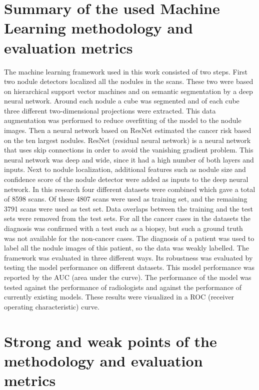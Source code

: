 \documentclass{article}
\begin{document}
\section{Summary of the used Machine Learning methodology and evaluation metrics}
The machine learning framework used in this work consisted of two steps. First two nodule detectors localized all the nodules in the scans. These two were based on hierarchical support vector machines and on semantic segmentation by a deep neural network. Around each nodule a cube was segmented and of each cube three different two-dimensional projections were extracted. This data augmentation was performed to reduce overfitting of the model to the nodule images. 
Then a neural network based on ResNet estimated the cancer risk based on the ten largest nodules. ResNet (residual neural network) is a neural network that uses skip connections in order to avoid the vanishing gradient problem. This neural network was deep and wide, since it had a high number of both layers and inputs. Next to nodule localization, additional features such as nodule size and confidence score of the nodule detector were added as inputs to the deep neural network.
In this research four different datasets were combined which gave a total of 8598 scans. Of these 4807 scans were used as training set, and the remaining 3791 scans were used as test set. Data overlaps between the training and the test sets were removed from the test sets. For all the cancer cases in the datasets the diagnosis was confirmed with a test such as a biopsy, but such a ground truth was not available for the non-cancer cases. The diagnosis of a patient was used to label all the nodule images of this patient, so the data was weakly labelled.    
The framework was evaluated in three different ways. Its robustness was evaluated by testing the model performance on different datasets. This model performance was reported by the AUC (area under the curve). The performance of the model was tested against the performance of radiologists and against the performance of currently existing models. These results were visualized in a ROC (receiver operating characteristic) curve.   

\section{Strong and weak points of the methodology and evaluation metrics}
\end{document}
